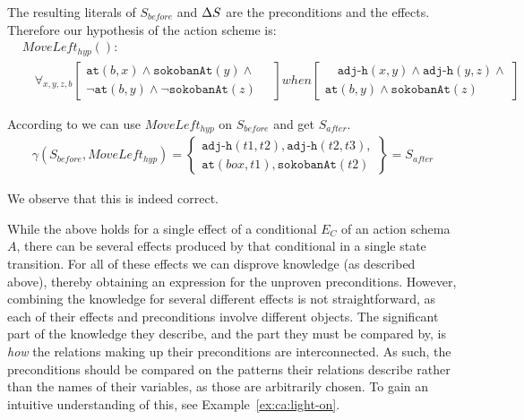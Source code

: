 \documentclass[\master/Master.tex]{subfiles}
\begin{document}
\begin{example}
	The resulting literals of $S_{before}$ and $\Delta S$ are the preconditions and the effects.
	Therefore our hypothesis of the action scheme is:
	\begin{align*}
		&MoveLeft_{hyp}():&  \\
		&\quad
		\forall_{x, y, z, b}
		\left[
		\begin{gathered}
			\texttt{at}(b, x) \land \texttt{sokobanAt}(y) \land \\ \neg\texttt{at}(b,y) \land \neg\texttt{sokobanAt}(z) \quad
		\end{gathered}
		\right]
		when
		\left[
		\begin{gathered}
			\quad \texttt{adj-h}(x, y) \land \texttt{adj-h}(y, z) \land \\ \texttt{at}(b,y) \land \texttt{sokobanAt}(z)
		\end{gathered}
		\right]&
	\end{align*}
	
	According to  we can use $MoveLeft_{hyp}$ on $S_{before}$ and get $S_{after}$.
	\begin{align*}
		&\gamma(S_{before},MoveLeft_{hyp}) =
		\left\{
		\begin{gathered}
			\texttt{adj-h}(t1, t2), \texttt{adj-h}(t2, t3), \\
			\texttt{at}(box,t1), \texttt{sokobanAt}(t2)
		\end{gathered}
		\right\}
		= S_{after}
		&
	\end{align*}
	
	We observe that this is indeed correct.
\end{example}

While the above holds for a single effect of a conditional $E_C$ of an action schema $A$, there can be several effects produced by that conditional in a single state transition. For all of these effects we can disprove knowledge (as described above), thereby obtaining an expression for the unproven preconditions. However, combining the knowledge for several different effects is not straightforward, as each of their effects and preconditions involve different objects. The significant part of the knowledge they describe, and the part they must be compared by, is \emph{how} the relations making up their preconditions are interconnected. As such, the preconditions should be compared on the patterns their relations describe rather than the names of their variables, as those are arbitrarily chosen. To gain an intuitive understanding of this, see Example~\ref{ex:ca:light-on}.
\end{document}
